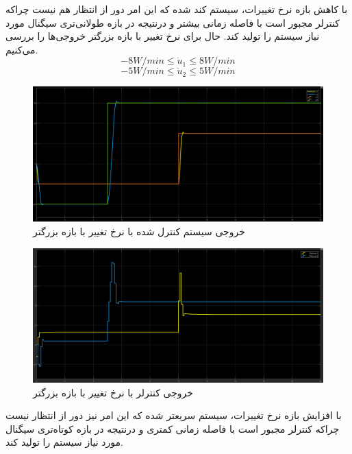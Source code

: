 \documentclass[14pt, a4paper]{extarticle}
\begin{document}
با کاهش بازه نرخ تغییرات، سیستم کند شده که این امر دور از انتظار هم نیست چراکه کنترلر مجبور است با فاصله زمانی بیشتر و درنتیجه در بازه طولانی‌تری سیگنال مورد نیاز سیستم را تولید کند.
\newpage
حال برای نرخ تغییر با بازه بزرگتر خروجی‌ها را بررسی می‌کنیم.\\
\[
-8 W/min \leq \dot{u}_1 \leq 8 W/min
\]
\[
-5 W/min \leq \dot{u}_2 \leq 5 W/min
\]
\begin{figure}[h!]
	\centering
	\includegraphics[scale = 0.3]{Q2_sim_result_conbig.png}
	\caption{خروجی سیستم کنترل شده با
		نرخ تغییر با بازه بزرگتر}
\end{figure}
\begin{figure}[h!]
	\centering
	\includegraphics[scale = 0.3]{Q2_sim_control_conbig.png}
	\caption{خروجی کنترلر با
		نرخ تغییر با بازه بزرگتر}
\end{figure}

با افزایش بازه نرخ تغییرات، سیستم سریعتر شده که این امر نیز دور از انتظار نیست چراکه کنترلر مجبور است با فاصله زمانی کمتری و درنتیجه در بازه کوتاه‌تری سیگنال مورد نیاز سیستم را تولید کند.

\newpage
\end{document}
